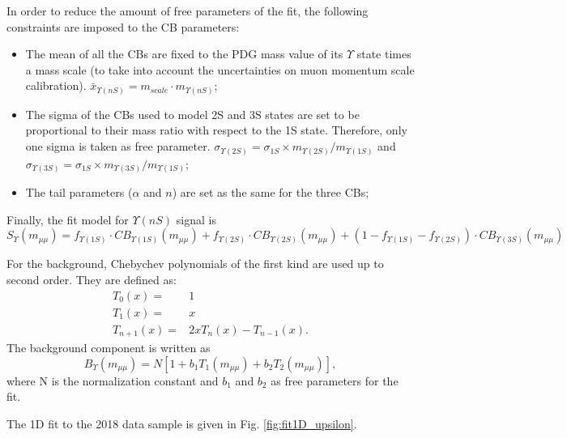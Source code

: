 In order to reduce the amount of free parameters of the fit, the following constraints are imposed to the CB parameters:
\begin{itemize}
  \item The mean of all the CBs are fixed to the PDG mass value of its $\Upsilon$ state times a mass scale (to take into account the uncertainties on muon momentum scale calibration). $\bar x_{\Upsilon(nS)} = m_{scale}\cdot m_{\Upsilon(nS)}$;
  \item The sigma of the CBs used to model 2S and 3S states are set to be proportional to their mass ratio with respect to the 1S state. Therefore, only one sigma is taken as free parameter. $\sigma_{\Upsilon(2S)} = \sigma_{1S}\times m_{\Upsilon(2S)}/m_{\Upsilon(1S)}$ and $\sigma_{\Upsilon(3S)} = \sigma_{1S}\times m_{\Upsilon(3S)}/m_{\Upsilon(1S)}$;
  \item The tail parameters ($\alpha$ and $n$) are set as the same for the three CBs;
\end{itemize}

Finally, the fit model for $\Upsilon(nS)$ signal is
\begin{equation} \label{eq:upsilon_sig}
  S_{\Upsilon}(m_{\mu\mu}) = f_{\Upsilon(1S)}\cdot CB_{\Upsilon(1S)} (m_{\mu\mu}) + f_{\Upsilon(2S)}\cdot CB_{\Upsilon(2S)} (m_{\mu\mu}) + (1-f_{\Upsilon(1S)}-f_{\Upsilon(2S)}) \cdot CB_{\Upsilon(3S)} (m_{\mu\mu})
\end{equation}

For the background, Chebychev polynomials of the first kind are used up to second order. They are defined as:
\begin{equation} \label{eq:upsilon_bkg}
  \begin{split}
    T_0(x) = & 1 \\
    T_1(x) = & x \\
    T_{n+1}(x) = & 2xT_n(x) - T_{n-1}(x).
  \end{split}
\end{equation}
The background component is written as
\begin{equation}
  B_{\Upsilon}(m_{\mu\mu}) = N[1 + b_1 T_1(m_{\mu\mu}) + b_2 T_2(m_{\mu\mu})],
\end{equation}
where N is the normalization constant and $b_1$ and $b_2$ as free parameters for the fit.

The 1D fit to the 2018 data sample is given in Fig. \ref{fig:fit1D_upsilon}.

